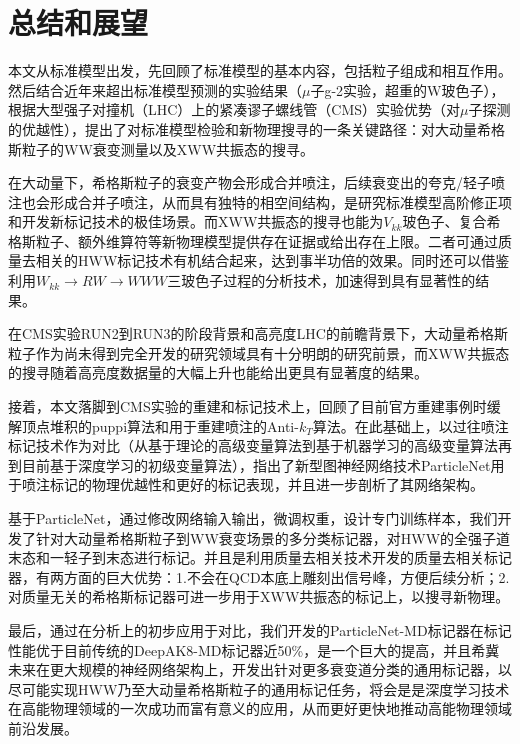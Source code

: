\chapter{总结和展望}
\fontsize{12bp}{14.4pt}

本文从标准模型出发，先回顾了标准模型的基本内容，包括粒子组成和相互作用。然后结合近年来超出标准模型预测的实验结果（$\mu$子g-2实验，超重的W玻色子），根据大型强子对撞机（LHC）上的紧凑谬子螺线管（CMS）实验优势（对$\mu$子探测的优越性），提出了对标准模型检验和新物理搜寻的一条关键路径：对大动量希格斯粒子的WW衰变测量以及XWW共振态的搜寻。

在大动量下，希格斯粒子的衰变产物会形成合并喷注，后续衰变出的夸克/轻子喷注也会形成合并子喷注，从而具有独特的相空间结构，是研究标准模型高阶修正项和开发新标记技术的极佳场景。而XWW共振态的搜寻也能为$V_{kk}$玻色子、复合希格斯粒子、额外维算符等新物理模型提供存在证据或给出存在上限。二者可通过质量去相关的HWW标记技术有机结合起来，达到事半功倍的效果。同时还可以借鉴利用$W_{kk}\to RW\to WWW$三玻色子过程的分析技术，加速得到具有显著性的结果。

在CMS实验RUN2到RUN3的阶段背景和高亮度LHC的前瞻背景下，大动量希格斯粒子作为尚未得到完全开发的研究领域具有十分明朗的研究前景，而XWW共振态的搜寻随着高亮度数据量的大幅上升也能给出更具有显著度的结果。

接着，本文落脚到CMS实验的重建和标记技术上，回顾了目前官方重建事例时缓解顶点堆积的puppi算法和用于重建喷注的Anti-$k_T$算法。在此基础上，以过往喷注标记技术作为对比（从基于理论的高级变量算法到基于机器学习的高级变量算法再到目前基于深度学习的初级变量算法），指出了新型图神经网络技术ParticleNet用于喷注标记的物理优越性和更好的标记表现，并且进一步剖析了其网络架构。

基于ParticleNet，通过修改网络输入输出，微调权重，设计专门训练样本，我们开发了针对大动量希格斯粒子到WW衰变场景的多分类标记器，对HWW的全强子道末态和一轻子到末态进行标记。并且是利用质量去相关技术开发的质量去相关标记器，有两方面的巨大优势：1.不会在QCD本底上雕刻出信号峰，方便后续分析；2.对质量无关的希格斯标记器可进一步用于XWW共振态的标记上，以搜寻新物理。

最后，通过在分析上的初步应用于对比，我们开发的ParticleNet-MD标记器在标记性能优于目前传统的DeepAK8-MD标记器近50\%，是一个巨大的提高，并且希冀未来在更大规模的神经网络架构上，开发出针对更多衰变道分类的通用标记器，以尽可能实现HWW乃至大动量希格斯粒子的通用标记任务，将会是是深度学习技术在高能物理领域的一次成功而富有意义的应用，从而更好更快地推动高能物理领域前沿发展。